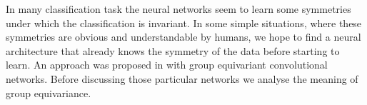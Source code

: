 \documentclass[../3.tex]{subfiles}
\begin{document}
    In many classification task the neural networks seem to learn some symmetries under which the classification is invariant.
    In some simple situations, where these symmetries are obvious and understandable by humans, we hope to find a neural architecture
    that already knows the symmetry of the data before starting to learn. An approach was proposed in \cite{G-CNN} with group equivariant
    convolutional networks. Before discussing those particular networks we analyse the meaning of group equivariance.
\end{document}
